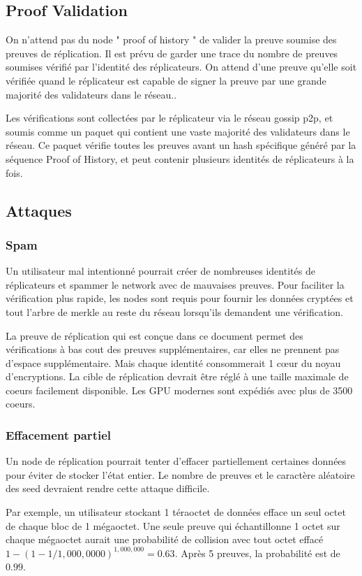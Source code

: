 \documentclass[12pt]{article}
\begin{document}
\subsection{Proof Validation}
On n’attend pas du node " proof of history " de valider la preuve soumise des preuves de réplication. Il est prévu de garder une trace du nombre de preuves soumises vérifié par l'identité des réplicateurs. On attend d’une preuve qu’elle soit vérifiée quand le réplicateur est capable de signer la preuve par une grande majorité des validateurs dans le réseau..

Les vérifications sont collectées par le réplicateur via le réseau gossip p2p, et soumis comme un paquet qui contient une vaste majorité des validateurs dans le réseau. Ce paquet vérifie toutes les preuves avant un hash spécifique généré par la séquence Proof of History, et peut contenir plusieurs identités de réplicateurs à la fois.
\subsection{Attaques}
\subsubsection{Spam}
Un utilisateur mal intentionné pourrait créer de nombreuses identités de réplicateurs et spammer le network avec de mauvaises preuves. Pour faciliter la vérification plus rapide, les nodes sont requis pour fournir les données cryptées et tout l'arbre de merkle au reste du réseau lorsqu'ils demandent une vérification.

La preuve de réplication qui est conçue dans ce document permet des vérifications à bas cout des preuves supplémentaires, car elles ne prennent pas d'espace supplémentaire. Mais chaque identité consommerait 1 cœur du noyau d’encryptions. La cible de réplication devrait être réglé à une taille maximale de coeurs facilement disponible. Les GPU modernes sont expédiés avec plus de 3500 coeurs.

\subsubsection{Effacement partiel}

Un node de réplication pourrait tenter d'effacer partiellement certaines données pour éviter de stocker l'état entier. Le nombre de preuves et le caractère aléatoire des seed devraient rendre cette attaque difficile.

Par exemple, un utilisateur stockant 1 téraoctet de données efface un seul octet de chaque bloc de 1 mégaoctet. Une seule preuve qui échantillonne 1 octet sur chaque mégaoctet aurait une probabilité de collision avec tout octet effacé \(1 - (1- 1/1,000,0000)^{1,000,000} = 0.63\). Après 5 preuves, la probabilité est de \(0.99\).
\end{document}
